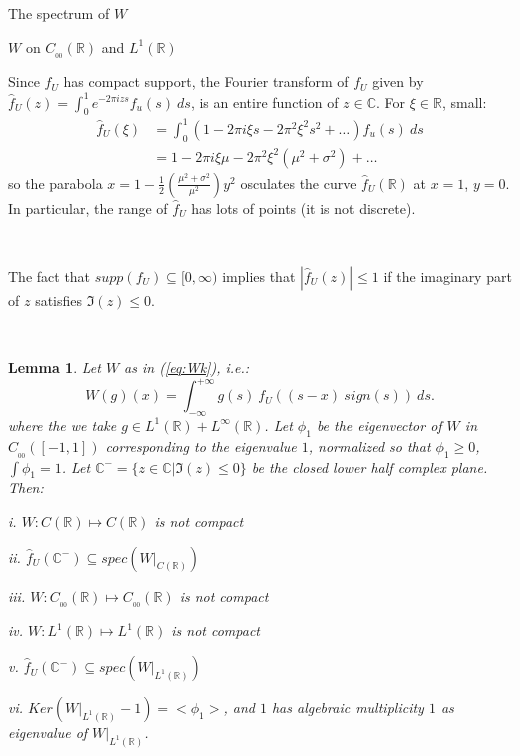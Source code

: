 \documentclass[12pt]{article}
\newtheorem*{lmm}{Lemma}
\begin{document}
\begin{section}{The spectrum of $W$ }
\begin{subsection}{$W$ on $C_{_{0\!0}}(\mathbb{R})$ and $L^1(\mathbb{R})$}
\  
\  

Since $f_U$ has compact support, the Fourier transform of $f_U$ given by $\hat{f}_U(z) = \int_0^1 e^{-2 \pi i z s} f_u(s) \ ds$, is an entire function of $z \in \mathbb{C}$. For $\xi \in \mathbb{R}$, small:
\begin{align*}
\hat{f}_U(\xi) &= \int_0^1 (1 - 2 \pi i \xi s - 2 \pi^2 \xi^2 s^2 + \dots) f_u(s) \ ds \\
&= 1 - 2 \pi i \xi \mu - 2 \pi^2 \xi^2 (\mu^2 + \sigma^2) + \dots
\end{align*}
so the parabola $x = 1 - \frac{1}{2} \left( \frac{\mu^2 + \sigma^2}{\mu^2} \right) y^2$ osculates the curve $\hat{f}_U(\mathbb{R})$ at $x=1$, $y=0$. In particular, the range of $\hat{f}_U$ has lots of points (it is not discrete). 

\  
\  

The fact that $supp(f_U) \subseteq [0,\infty)$ implies that $|\hat{f}_U(z)| \le 1$ if the imaginary part of $z$ satisfies $\Im(z) \le 0$.  

\  
\  

\begin{lmm}  Let $W$ as in (\ref{eq:Wk}), i.e.:
	\begin{equation*}
	W(g)(x) = \int_{-\infty}^{+\infty} g(s)\ f_U\!\left(  \left(s - x \right)\ sign(s) \right) \ ds.
	\end{equation*}
 where the we take $g \in  L^1(\mathbb{R}) + L^{\infty}(\mathbb{R})$. Let $\phi_1$ be the eigenvector of $W$ in $C_{_{0\!0}}([-1,1])$ corresponding to the eigenvalue $1$, normalized so that $\phi_1 \ge 0$, $\int \phi_1 = 1$. Let $\mathbb{C}^- = \{z \in \mathbb{C}| \Im(z) \le 0 \}$ be the closed lower half complex plane. Then:
	\item[i.]  $W: C(\mathbb{R}) \longmapsto C(\mathbb{R})$ is not compact
	
	\item[ii.] $\hat{f}_U(\mathbb{C}^-) \subseteq spec\left(W\Big|_{C(\mathbb{R})}  \right)$
	
	\item[iii.]  $W: C_{_{0\!0}}(\mathbb{R}) \longmapsto C_{_{0\!0}}(\mathbb{R}) $ is not compact
	
	\item[iv.]  $W: L^1(\mathbb{R}) \longmapsto L^1(\mathbb{R}) $ is not compact
	
	\item[v.] $\hat{f}_U(\mathbb{C}^-) \subseteq spec(W\Big|_{L^1(\mathbb{R})}) $

	\item[vi.] $ Ker\left( W\Big|_{L^1(\mathbb{R})} - 1 \right) = <\phi_1>$, and $1$ has algebraic multiplicity $1$ as eigenvalue of $W\Big|_{L^1(\mathbb{R})}$.
\end{lmm}
\  


\end{subsection}
\end{section}
\end{document}
